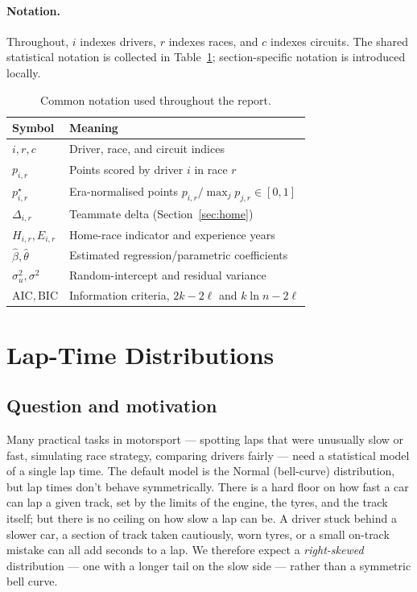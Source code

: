 \documentclass[11pt,a4paper]{article}
\theoremstyle{remark}
\begin{document}
\paragraph{Notation.}
Throughout, $i$ indexes drivers, $r$ indexes races, and $c$ indexes
circuits. The shared statistical notation is collected in
Table~\ref{tab:notation}; section-specific notation is introduced
locally.

\begin{table}[H]
  \centering
  \small
  \caption{Common notation used throughout the report.}
  \label{tab:notation}
  \begin{tabular}{ll}
    \toprule
    Symbol & Meaning \\
    \midrule
    $i,r,c$                        & Driver, race, and circuit indices \\
    $p_{i,r}$                      & Points scored by driver $i$ in race $r$ \\
    $p^\star_{i,r}$                & Era-normalised points $p_{i,r}/\max_j p_{j,r}\in[0,1]$ \\
    $\Delta_{i,r}$                 & Teammate delta (Section~\ref{sec:home}) \\
    $H_{i,r}, E_{i,r}$             & Home-race indicator and experience years \\
    $\hat\beta,\hat\theta$         & Estimated regression/parametric coefficients \\
    $\sigma_u^2,\sigma^2$          & Random-intercept and residual variance \\
    $\mathrm{AIC}, \mathrm{BIC}$   & Information criteria, $2k-2\ell$ and $k\ln n - 2\ell$ \\
    \bottomrule
  \end{tabular}
\end{table}

\section{Lap-Time Distributions}\label{sec:lap}

\subsection{Question and motivation}
Many practical tasks in motorsport --- spotting laps that were
unusually slow or fast, simulating race strategy, comparing drivers
fairly --- need a statistical model of a single lap time. The
default model is the Normal (bell-curve) distribution, but lap
times don't behave symmetrically. There is a hard floor on how fast
a car can lap a given track, set by the limits of the engine, the
tyres, and the track itself; but there is no ceiling on how slow a
lap can be. A driver stuck behind a slower car, a section of track
taken cautiously, worn tyres, or a small on-track mistake can all
add seconds to a lap. We therefore expect a \emph{right-skewed}
distribution --- one with a longer tail on the slow side --- rather
than a symmetric bell curve.
\end{document}
